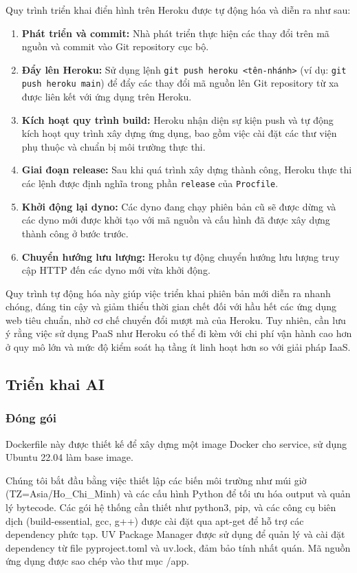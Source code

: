 Quy trình triển khai điển hình trên Heroku được tự động hóa và diễn ra như sau:
\begin{enumerate}
    \item \textbf{Phát triển và commit:} Nhà phát triển thực hiện các thay đổi trên mã nguồn và commit vào Git repository cục bộ.
    \item \textbf{Đẩy lên Heroku:} Sử dụng lệnh \texttt{git push heroku <tên-nhánh>} (ví dụ: \texttt{git push heroku main}) để đẩy các thay đổi mã nguồn lên Git repository từ xa được liên kết với ứng dụng trên Heroku.
    \item \textbf{Kích hoạt quy trình build:} Heroku nhận diện sự kiện push và tự động kích hoạt quy trình xây dựng ứng dụng, bao gồm việc cài đặt các thư viện phụ thuộc và chuẩn bị môi trường thực thi.
    \item \textbf{Giai đoạn release:} Sau khi quá trình xây dựng thành công, Heroku thực thi các lệnh được định nghĩa trong phần \texttt{release} của \texttt{Procfile}.
    \item \textbf{Khởi động lại dyno:} Các dyno đang chạy phiên bản cũ sẽ được dừng và các dyno mới được khởi tạo với mã nguồn và cấu hình đã được xây dựng thành công ở bước trước.
    \item \textbf{Chuyển hướng lưu lượng:} Heroku tự động chuyển hướng lưu lượng truy cập HTTP đến các dyno mới vừa khởi động.
\end{enumerate}
Quy trình tự động hóa này giúp việc triển khai phiên bản mới diễn ra nhanh chóng, đáng tin cậy và giảm thiểu thời gian chết đối với hầu hết các ứng dụng web tiêu chuẩn, nhờ cơ chế chuyển đổi mượt mà của Heroku. Tuy nhiên, cần lưu ý rằng việc sử dụng PaaS như Heroku có thể đi kèm với chi phí vận hành cao hơn ở quy mô lớn và mức độ kiểm soát hạ tầng ít linh hoạt hơn so với giải pháp IaaS.

\subsection{Triển khai AI}
\subsubsection{Đóng gói}

Dockerfile này được thiết kế để xây dựng một image Docker cho service, sử dụng Ubuntu 22.04 làm base image. 

Chúng tôi bắt đầu bằng việc thiết lập các biến môi trường như múi giờ (TZ=Asia/Ho\_Chi\_Minh) và các cấu hình Python để tối ưu hóa output và quản lý bytecode. Các gói hệ thống cần thiết như python3, pip, và các công cụ biên dịch (build-essential, gcc, g++) được cài đặt qua apt-get để hỗ trợ các dependency phức tạp. UV Package Manager được sử dụng để quản lý và cài đặt dependency từ file pyproject.toml và uv.lock, đảm bảo tính nhất quán. Mã nguồn ứng dụng được sao chép vào thư mục /app. 

